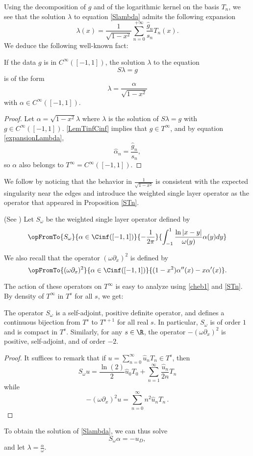 \documentclass[a4paper]{article}
\begin{document}
	Using the decomposition of $g$ and of the logarithmic kernel on the basis $T_n$, we see that the solution $\lambda$ to equation \eqref{Slambda} admits the following expansion 
	\begin{equation}
	\lambda(x) = \frac{1}{\sqrt{1-x^2}}\sum_{n=0}^{+ \infty} \frac{\hat{g}_n}{s_n} T_n(x).
	\label{expansionLambda}
	\end{equation}
	We deduce the following well-known fact:
	\begin{Cor}
		\label{CorSingularity}
		If the data $g$ is in $C^{\infty}([-1,1])$, the solution $\lambda$ to the equation 
		\[S\lambda = g\]
		is of the form 
		\[\lambda = \dfrac{\alpha}{\sqrt{1-x^2}}\]
		with $\alpha \in C^{\infty}([-1,1])$.  
		\begin{proof}
			Let $\alpha = \sqrt{1 - x^2}\lambda$ where $\lambda$ is the solution of $S\lambda = g$ with $g \in C^{\infty}([-1,1])$. 
			\autoref{LemTinfCinf} implies that $g \in T^{\infty}$, and by equation \eqref{expansionLambda}, 
			\[ \hat{\alpha}_n = \frac{\hat{g}_n}{s_n},\]
			so $\alpha$ also  belongs to $T^{\infty} = C^{\infty}([-1,1])$. 
		\end{proof}
	\end{Cor}
	
	
	We follow \cite{bruno2012second} by noticing that the behavior in $\frac{1}{\sqrt{1-x^2}}$ is consistent with the expected singularity near the edges and introduce the weighted single layer operator as the operator that appeared in Proposition \ref{STn}.
	\begin{Def}(See \cite{bruno2012second}) 
		Let $S_\omega$ be the weighted single layer operator defined by
		\[\opFromTo{S_\omega}{\alpha \in \Cinf([-1,1])}{-\dfrac{1}{2\pi}}{\int_{-1}^1\dfrac{\ln|x-y|}{\omega(y)} \alpha(y)dy}\]
	\end{Def}
	\noindent We also recall that the operator $(\omega\partial_x)^2$ is defined by \[\opFromTo{(\omega\partial_x)^2}{\alpha \in \Cinf([-1,1])}{(1-x^2)\alpha''(x) - x \alpha'(x)}.\]
	
	The action of these operators on $T^{\infty}$ is easy to analyze using \eqref{cheb1} and \autoref{STn}. By density of $T^{\infty}$ in $T^s$ for all $s$, we get:
	\begin{Prop}
		The operator $S_\omega$ is a self-adjoint, positive definite operator, and defines a continuous bijection from $T^{s}$ to $T^{s+1}$ for all real $s$. In particular, $S_\omega$ is of order $1$ and is compact in $T^s$. 
		Similarly, for any $s \in \R$, the operator $-(\omega \partial_x)^2$ is positive, self-adjoint, and of order $-2$. 
	\end{Prop}
	\begin{proof}
		It suffices to remark that if $u=\sum_{n=0}^\infty \hat{u}_n T_n \in T^s$, then
		\[S_\omega u = \frac{\ln(2)}{2} \hat{u}_0 T_0 +  \sum_{n=1}^\infty \frac{\hat{u}_n}{2n} T_n\]
		while
		\[-(\omega \partial_x)^2 u = \sum_{n=0}^\infty n^2\hat{u}_n T_n \,.\]
	\end{proof}
	\noindent To obtain the solution of \eqref{Slambda}, we can thus solve 
	\begin{equation}
	S_\omega \alpha = -u_D,
	\label{Somegaalpha}
	\end{equation}
	and let $\lambda = \frac{\alpha}{\omega}$.  
	
\end{document}

